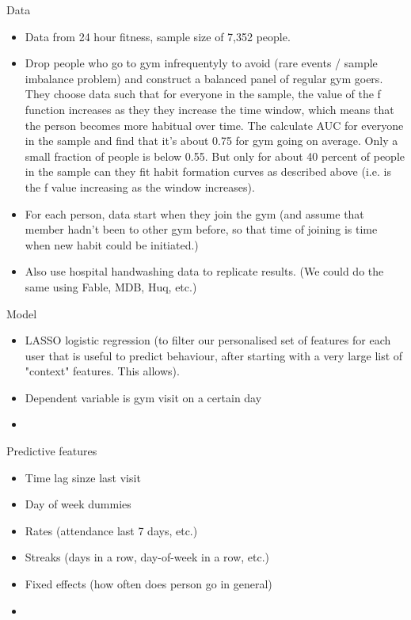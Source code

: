 \documentclass[a4paper, 11pt]{report}
\begin{document}
Data
\begin{itemize}
    \item Data from 24 hour fitness, sample size of 7,352 people.

    \item Drop people who go to gym infrequentyly to avoid (rare events / sample
        imbalance problem) and construct a balanced panel of regular gym goers.
        They choose data such that for everyone in the sample, the value of the
        f function increases as they they increase the time window, which means
        that the person becomes more habitual over time. The calculate AUC for
        everyone in the sample and find that it's about 0.75 for gym going on
        average. Only a small fraction of people is below 0.55. But only for
        about 40 percent of people in the sample can they fit habit formation
        curves as described above (i.e. is the f value increasing as the window
        increases).
    
    \item For each person, data start when they join the gym (and assume that
        member hadn't been to other gym before, so that time of joining is time
        when new habit could be initiated.)

    \item Also use hospital handwashing data to replicate results. (We could do
        the same using Fable, MDB, Huq, etc.)
\end{itemize}

Model
\begin{itemize}
    \item LASSO logistic regression (to filter our personalised set of features
        for each user that is useful to predict behaviour, after starting with a
        very large list of "context" features. This allows). 

    \item Dependent variable is gym visit on a certain day

    \item
\end{itemize}

Predictive features
\begin{itemize}
    \item Time lag sinze last visit
    \item Day of week dummies
    \item Rates (attendance last 7 days, etc.)
    \item Streaks (days in a row, day-of-week in a row, etc.)
    \item Fixed effects (how often does person go in general)
    \item 
\end{itemize}
\end{document}
